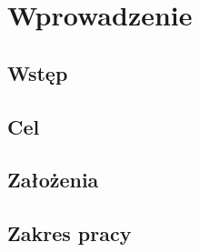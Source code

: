 \chapter{Wprowadzenie}
\label{t:int}

\section{Wstęp}

\section{Cel}

\section{Założenia}

\section{Zakres pracy}